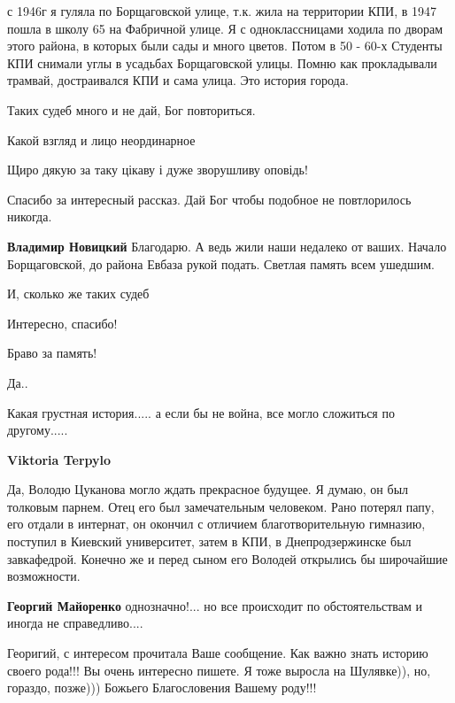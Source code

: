 \begin{itemize}
с 1946г я гуляла по Борщаговской улице, т.к. жила на территории КПИ, в 1947
пошла в школу 65 на Фабричной улице. Я с одноклассницами ходила по дворам этого
района, в которых были сады и много цветов. Потом в 50 - 60-х Студенты КПИ
снимали углы в усадьбах Борщаговской улицы. Помню как прокладывали трамвай,
достраивался КПИ и сама улица. Это история города.

Таких судеб много и не дай, Бог повториться.

Какой взгляд и лицо неординарное

Щиро дякую за таку цікаву і дуже зворушливу оповідь!


Спасибо за интересный рассказ. Дай Бог чтобы подобное не повтлорилось никогда.

\begin{itemize} %
\textbf{Владимир Новицкий} Благодарю. А ведь жили наши недалеко от ваших. Начало Борщаговской, до района Евбаза рукой подать. Светлая память всем ушедшим.
\end{itemize} %

И, сколько же таких судеб

Интересно, спасибо!

Браво за память!

Да..

Какая грустная история..... а если бы не война, все могло сложиться по другому.....

\begin{itemize} %
\textbf{Viktoria Terpylo} 

Да, Володю Цуканова могло ждать прекрасное будущее. Я думаю, он был толковым
парнем. Отец его был замечательным человеком. Рано потерял папу, его отдали в
интернат, он окончил с отличием благотворительную гимназию, поступил в Киевский
университет, затем в КПИ, в Днепродзержинске был завкафедрой. Конечно же и
перед сыном его Володей открылись бы широчайшие возможности.


\textbf{Георгий Майоренко} однозначно!... но все происходит по обстоятельствам и иногда не справедливо....
\end{itemize} %


Георигий, с интересом прочитала Ваше сообщение. Как важно знать историю своего
рода!!! Вы очень интересно пишете. Я тоже выросла на Шулявке)), но, гораздо,
позже))) Божьего Благословения Вашему роду!!!


\end{itemize}
